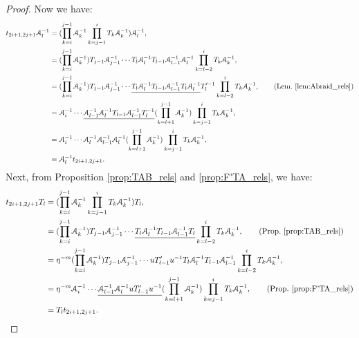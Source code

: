 \documentclass{amsart}
\begin{document}
\begin{proof}
Now we have:
\[
\begin{aligned}
t_{2i+1,2j+1}\AA^{-1}_l&=(\prod^{j-1}_{k=i}\AA^{-1}_k\prod^{i}_{k=j-1}T_k\AA^{-1}_k)\AA^{-1}_l,\\
&=(\prod^{j-1}_{k=i}\AA^{-1}_k)T_{j-1}\AA^{-1}_{j-1}\cdots T_{l}\AA^{-1}_{l}T_{l-1}\AA^{-1}_{l-1}\AA^{-1}_l\prod^{i}_{k=l-2}T_k\AA^{-1}_k, \\
&=(\prod^{j-1}_{k=i}\AA^{-1}_k)T_{j-1}\AA^{-1}_{j-1}\cdots \underline{T_{l}\AA^{-1}_{l}T_{l-1}\AA^{-1}_{l-1}T_l\AA^{-1}_l}T'^{-1}_l\prod^{i}_{k=l-2}T_k\AA^{-1}_k,\qquad (\text{Lem.~\ref{lem:Abraid_rels}})\\
&=\AA^{-1}_i\cdots\underline{\AA^{-1}_{l-1}\AA^{-1}_{l}T_{l-1}\AA^{-1}_{l-1}T^{-1}_l}(\prod^{j-1}_{k=l+1}\AA^{-1}_k)\prod^{i}_{k=j-1}T_k\AA^{-1}_k,\\
&=\AA^{-1}_i\cdots \AA^{-1}_{l}\AA^{-1}_{l-1}\AA^{-1}_{l}(\prod^{j-1}_{k=l+1}\AA^{-1}_k)\prod^{i}_{k=j-1}T_k\AA^{-1}_k,\\
&=\AA^{-1}_lt_{2i+1,2j+1}.
\end{aligned}
\]
Next, from Proposition \ref{prop:TAB_rels} and \ref{prop:F'TA_rels}, we have:
\[
\begin{aligned}
t_{2i+1,2j+1}T_l&=(\prod^{j-1}_{k=i}\AA^{-1}_k\prod^{i}_{k=j-1}T_k\AA^{-1}_k)T_l,\\
&=(\prod^{j-1}_{k=i}\AA^{-1}_k)T_{j-1}\AA^{-1}_{j-1}\cdots \underline{T_{l}\AA^{-1}_{l}T_{l-1}\AA^{-1}_{l-1}T_l}\prod^{i}_{k=l-2}T_k\AA^{-1}_k, \qquad (\text{Prop.~\ref{prop:TAB_rels}})\\ 
&=\eta^{-m}(\prod^{j-1}_{k=i}\AA^{-1}_k)T_{j-1}\AA^{-1}_{j-1}\cdots uT'_{l-1}u^{-1}T_{l}\AA^{-1}_{l}T_{l-1}\AA^{-1}_{l-1}\prod^{i}_{k=l-2}T_k\AA^{-1}_k, \\
&=\eta^{-m}\AA^{-1}_i\cdots\underline{\AA^{-1}_{l-1}\AA^{-1}_{l}uT'_{l-1}u^{-1}}(\prod^{j-1}_{k=l+1}\AA^{-1}_k)\prod^{i}_{k=j-1}T_k\AA^{-1}_k, \qquad(\text{Prop.~\ref{prop:F'TA_rels}})\\
&=T_lt_{2i+1,2j+1}.
\end{aligned}
\]


\end{proof}
\end{document}
